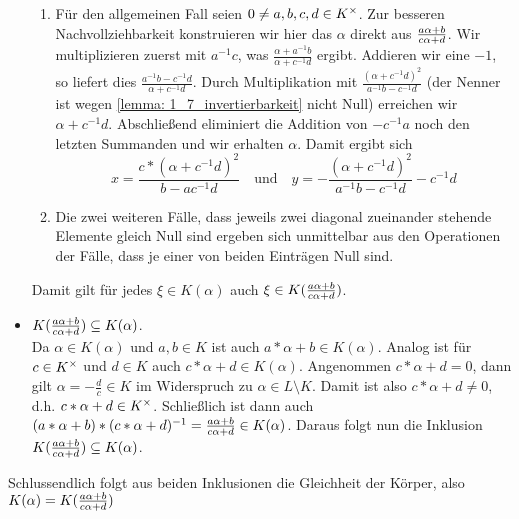 \begin{exercisePage}
\begin{itemize}[leftmargin=*]
\begin{enumerate}[leftmargin=*, label=(\roman*)]
            \item Für den allgemeinen Fall seien $0 \neq a,b,c,d \in {K}^{\times}$. Zur besseren Nachvollziehbarkeit konstruieren wir hier das $\alpha$ direkt aus $\frac{a \alpha + b}{c \alpha + d}$. Wir multiplizieren zuerst mit $a^{-1}c$, was $\frac{\alpha + a^{-1}b}{\alpha + c^{-1}d}$ ergibt. Addieren wir eine $-1$, so liefert dies $\frac{a^{-1}b - c^{-1} d}{\alpha + c^{-1} d}$. Durch Multiplikation mit $\frac{(\alpha + c^{-1}d)^2}{a^{-1}b - c^{-1}d}$ (der Nenner ist wegen \cref{lemma: 1_7_invertierbarkeit} nicht Null) erreichen wir $\alpha + c^{-1}d$. Abschließend eliminiert die Addition von $-c^{-1}a$ noch den letzten Summanden und wir erhalten $\alpha$. Damit ergibt sich
            \begin{equation*}
                x = \frac{c * (\alpha + c^{-1}d)^2}{b - ac^{-1}d} \quad \text{und} \quad
                y = - \frac{(\alpha + c^{-1}d)^2}{a^{-1}b - c^{-1}d} - c^{-1}d
            \end{equation*}
            \item Die zwei weiteren Fälle, dass jeweils zwei diagonal zueinander stehende Elemente gleich Null sind ergeben sich unmittelbar aus den Operationen der Fälle, dass je einer von beiden Einträgen Null sind.
        \end{enumerate}
        Damit gilt für jedes $\xi \in K(\alpha)$ auch $\xi \in K(\frac{a \alpha + b}{c \alpha + d})$.
        
        \item $K(\frac{a \alpha + b}{c \alpha + d}) \subseteq K(\alpha)$. \\ 
        Da $\alpha \in K(\alpha)$ und $a,b \in K$ ist auch $a * \alpha + b \in K(\alpha)$. Analog ist für $c \in {K}^{\times}$ und $d \in K$ auch $c * \alpha + d \in K(\alpha)$. Angenommen $c * \alpha + d = 0$, dann gilt $\alpha = -\frac{d}{c} \in K$ im Widerspruch zu $\alpha \in L \setminus K$. Damit ist also $c * \alpha + d \neq 0$, d.h. $c * \alpha + d \in {K}^{\times}$. Schließlich ist dann auch $(a * \alpha + b) * (c * \alpha + d)^{-1} = \frac{a \alpha + b}{c \alpha + d} \in K(\alpha)$. Daraus folgt nun die Inklusion $K(\frac{a \alpha + b}{c \alpha + d}) \subseteq K(\alpha)$.
    \end{itemize}
    Schlussendlich folgt aus beiden Inklusionen die Gleichheit der Körper, also $K(\alpha) = K(\frac{a \alpha + b}{c \alpha + d})$
    
    \undef\bruch
    \undef\mymatrix
    


\end{exercisePage}
